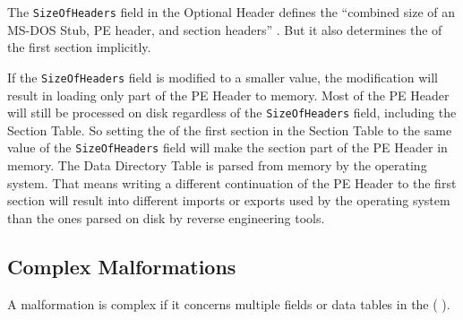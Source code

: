 The \texttt{SizeOfHeaders} field in the Optional Header defines the \enquote{combined size of an MS-DOS Stub, PE header, and section headers} \cite[]{pespec}. But it also determines the \VA{} of the first section implicitly. \cite[slide 15]{vuksan11} 

If the \texttt{SizeOfHeaders} field is modified to a smaller value, the modification will result in loading only part of the PE Header to memory. Most of the PE Header will still be processed on disk regardless of the \texttt{SizeOfHeaders} field, including the Section Table. So setting the \VA{} of the first section in the Section Table to the same value of the \texttt{SizeOfHeaders} field will make the section part of the PE Header in memory. 
The Data Directory Table is parsed from memory by the operating system. That means writing a different continuation of the PE Header to the first section will result into \eg{} different imports or exports used by the operating system than the ones parsed on disk by reverse engineering tools.


\subsection{Complex Malformations}

A malformation is complex if it concerns multiple fields or data tables in the \PE{} (\cf{} \cite[slide 7]{vuksan11}).
